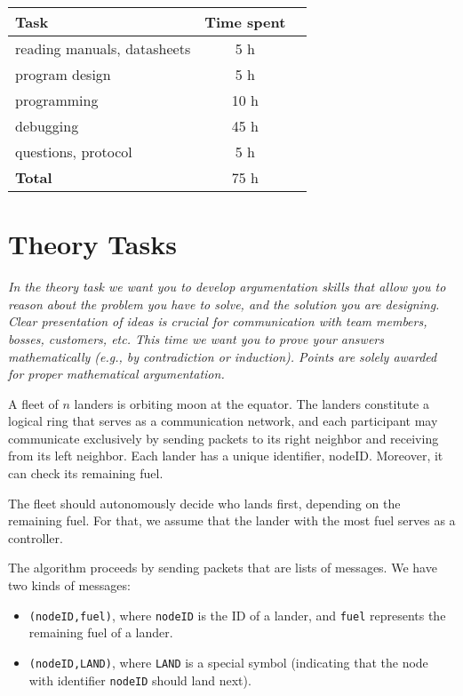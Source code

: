 \documentclass[12pt,a4paper,titlepage,oneside]{article}
\begin{document}
\begin{tabular}{|l|c|c|}\hline
	Task & Time spent \\ \hline

	reading manuals, datasheets &  5 h\\
	program design              &  5 h\\
	programming                 & 10 h\\
	debugging                   & 45 h\\
	questions, protocol         &  5 h\\ \hline

	\textbf{Total}              & 75 h\\ \hline
\end{tabular}



\section{Theory Tasks}



\emph{%
In the theory task we want you to develop argumentation skills that
     allow you to reason about the problem you have to solve, and the
     solution you are designing.
Clear presentation of ideas is crucial for communication with team
     members, bosses, customers, etc.
This time we want you to prove your answers mathematically (e.g., by
     contradiction or induction).
Points are solely awarded for proper mathematical argumentation.}

A fleet of $n$ landers is orbiting moon at the equator.
The landers constitute a logical ring that serves as a communication
     network, and each participant may communicate exclusively by
     sending packets to its right neighbor and receiving from its left
     neighbor.
Each lander has a unique identifier, nodeID.
Moreover, it can check its remaining fuel.

The fleet should autonomously decide who lands first, depending on the
     remaining fuel.
For that, we assume that the lander with the most fuel serves as a
     controller.

The algorithm proceeds by sending packets that are lists of
messages. We have two kinds of messages:
\begin{itemize}
\item \texttt{(nodeID,fuel)}, where \texttt{nodeID} is the ID of a lander, and
\texttt{fuel} represents the remaining fuel of a lander.
\item \texttt{(nodeID,LAND)}, where \texttt{LAND} is a special symbol
  (indicating that the node with identifier \texttt{nodeID} should land next).
\end{itemize}
\end{document}
